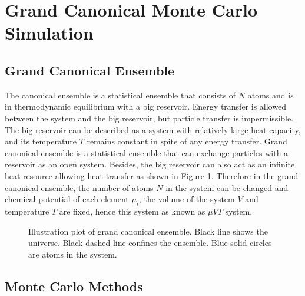 \section{Grand Canonical Monte Carlo Simulation}
\label{Chap:Mech:GCMC}

\subsection{Grand Canonical Ensemble}

The canonical ensemble is a statistical ensemble that consists of $N$ atoms and is in thermodynamic equilibrium with a big reservoir. Energy transfer is allowed between the system and the big reservoir, but particle transfer is impermissible. The big reservoir can be described as a system with relatively large heat capacity, and its temperature $T$ remains constant in spite of any energy transfer. Grand canonical ensemble is a statistical ensemble that can exchange particles with a reservoir as an open system. Besides, the big reservoir can also act as an infinite heat resource allowing heat transfer as shown in Figure \ref{Chap:Meth:GCMC:fig1}. \cite{frenkel2001understanding} Therefore in the grand canonical ensemble, the number of atoms $N$ in the system can be changed and chemical potential of each element $\mu_i$, the volume of the system $V$ and temperature $T$ are fixed, hence this system as known as $\mu VT$ system.

\begingroup
\begin{figure}[!ht]
  \centering
  \caption[Illustration plot of grand canonical ensemble]{Illustration plot of grand canonical ensemble. Black line shows the universe. Black dashed line confines the ensemble. Blue solid circles are atoms in the system.}
  \label{Chap:Meth:GCMC:fig1}
\end{figure}
\endgroup

\subsection{Monte Carlo Methods}
\label{Chap:Mech:GCMC:MC}

